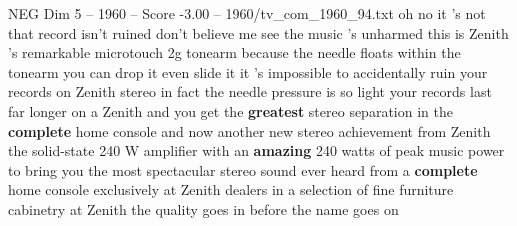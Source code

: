 \begin{textsample}{NEG Dim 5 – 1960 – Score -3.00 – 1960/tv\_com\_1960\_94.txt}  \label{ex:f5_neg_010}
oh no it 's not that record isn't ruined don't believe me see the music 's unharmed this is Zenith 's remarkable microtouch 2g tonearm because the needle floats within the tonearm you can drop it even slide it it 's impossible to accidentally ruin your records on Zenith stereo in fact the needle pressure is so light your records last far longer on a Zenith and you get the \textbf{greatest} stereo separation in the \textbf{complete} home console and now another new stereo achievement from Zenith the solid-state 240 W amplifier with an \textbf{amazing} 240 watts of peak music power to bring you the most spectacular stereo sound ever heard from a \textbf{complete} home console exclusively at Zenith dealers in a selection of fine furniture cabinetry at Zenith the quality goes in before the name goes on

\end{textsample}

